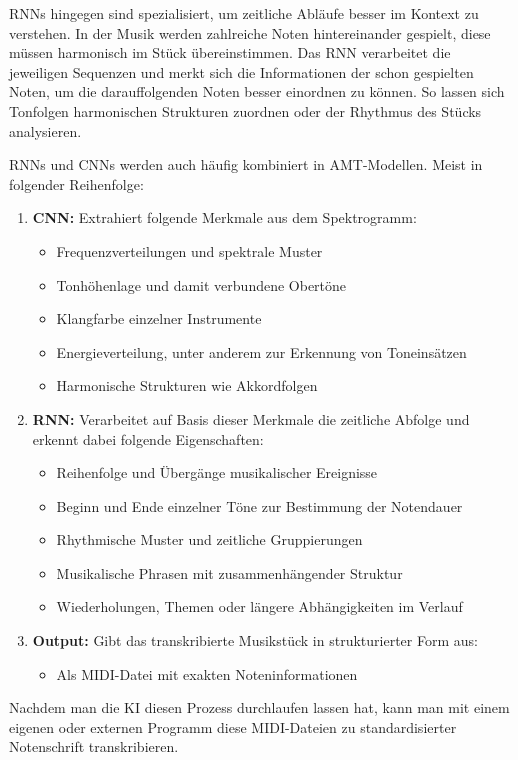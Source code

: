 RNNs hingegen sind spezialisiert, um zeitliche Abläufe besser im Kontext zu verstehen.
In der Musik werden zahlreiche Noten hintereinander gespielt, diese müssen harmonisch im Stück übereinstimmen.
Das RNN verarbeitet die jeweiligen Sequenzen und merkt sich die Informationen der schon gespielten Noten,
um die darauffolgenden Noten besser einordnen zu können.
So lassen sich Tonfolgen harmonischen Strukturen zuordnen oder der Rhythmus des Stücks analysieren.
\cite{Boeck2012}

RNNs und CNNs werden auch häufig kombiniert in AMT-Modellen.
Meist in folgender Reihenfolge:
\begin{enumerate}
    \item \textbf{CNN:} Extrahiert folgende Merkmale aus dem Spektrogramm:
    \begin{itemize}
        \item Frequenzverteilungen und spektrale Muster
        \item Tonhöhenlage und damit verbundene Obertöne
        \item Klangfarbe einzelner Instrumente
        \item Energieverteilung, unter anderem zur Erkennung von Toneinsätzen
        \item Harmonische Strukturen wie Akkordfolgen
    \end{itemize}

    \item \textbf{RNN:} Verarbeitet auf Basis dieser Merkmale die zeitliche Abfolge und erkennt dabei folgende Eigenschaften:
    \begin{itemize}
        \item Reihenfolge und Übergänge musikalischer Ereignisse
        \item Beginn und Ende einzelner Töne zur Bestimmung der Notendauer
        \item Rhythmische Muster und zeitliche Gruppierungen
        \item Musikalische Phrasen mit zusammenhängender Struktur
        \item Wiederholungen, Themen oder längere Abhängigkeiten im Verlauf
    \end{itemize}

    \item \textbf{Output:} Gibt das transkribierte Musikstück in strukturierter Form aus:
    \begin{itemize}
        \item Als MIDI-Datei mit exakten Noteninformationen
    \end{itemize}
\end{enumerate}
Nachdem man die KI diesen Prozess durchlaufen lassen hat, kann man mit einem eigenen oder externen Programm
diese MIDI-Dateien zu standardisierter Notenschrift transkribieren.

